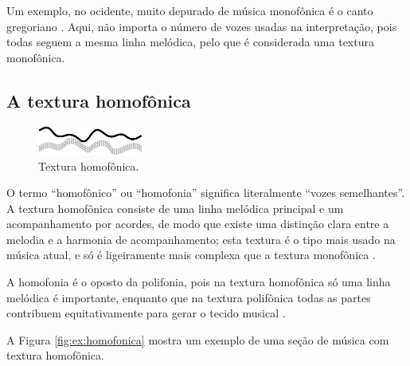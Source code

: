 \begin{example}
Um exemplo, no ocidente,  muito depurado de música monofônica é o canto gregoriano
\cite[pp. 77]{copland1974ouvir} \cite[pp. 29]{kerman2015listen} \cite[pp. 58]{holland2013music}. 
Aqui, não importa o número de vozes usadas na interpretação,
pois todas seguem a mesma linha melódica, pelo que é considerada uma textura monofônica.
\end{example}


\subsection{A textura homofônica}
\label{subsec:homofonica}
\begin{figure}
  \centering
    \includegraphics[width=0.31\textwidth]{chapters/cap-musicalidade-percepcion/honofonica1.eps}
  \caption{Textura homofônica.}
\end{figure}
O termo ``homofônico'' ou ``homofonia'' significa literalmente ``vozes semelhantes''.%
A textura homofônica consiste de uma linha melódica principal e um acompanhamento por acordes,
de modo que existe uma distinção clara entre a melodia e a harmonia de acompanhamento;
esta textura é o tipo  mais usado na música atual,
e só é ligeiramente mais complexa que a textura monofônica 
\cite[pp. 78]{copland1974ouvir} \cite[pp. 29]{kerman2015listen} 
\cite[pp. 43]{bennett1993elementos} \cite[pp. 58]{holland2013music}.


A homofonia é o oposto da polifonia, 
pois na textura homofônica só uma linha melódica é importante,
enquanto que na textura polifônica todas as partes contribuem equitativamente para gerar o tecido musical
\cite[pp. 687]{apel1969harvard}.

\begin{example}
A Figura \ref{fig:ex:homofonica} mostra um exemplo de uma seção de música com textura homofônica.
\end{example}

